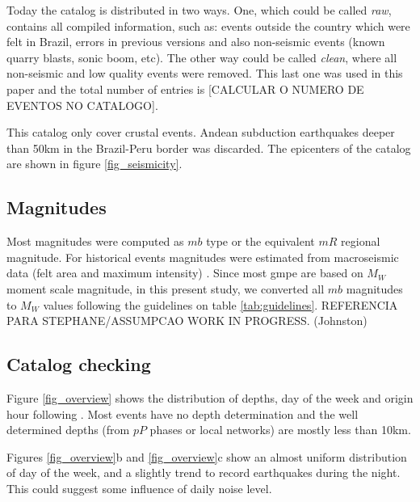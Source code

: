 \documentclass[grl]{agutex}
\begin{document}
\begin{article}
Today the catalog is distributed in two ways. One, which could be called \emph{raw}, contains all compiled information, such as: events outside the country which were felt in Brazil, errors in previous versions and also non-seismic events (known quarry blasts, sonic boom, etc). The other way could be called \emph{clean}, where all non-seismic and low quality events were removed. This last one was used in this paper and the total number of entries is [CALCULAR O NUMERO DE EVENTOS NO CATALOGO].

This catalog only cover crustal events. Andean subduction earthquakes deeper than 50km in the Brazil-Peru border was discarded. The epicenters of the catalog are shown in figure \ref{fig_seismicity}.



\subsection{Magnitudes}

Most magnitudes were computed as $mb$ type or the equivalent $mR$ \citep{assumpcao_1983} regional magnitude. For historical events magnitudes were estimated from macroseismic data (felt area and maximum intensity) \citep{berrocal_1984}. Since most \gls{gmpe} are based on $M_W$ moment scale magnitude, in this present study, we converted all $mb$ magnitudes to $M_W$ values following the guidelines on table \ref{tab:guidelines}. REFERENCIA PARA STEPHANE/ASSUMPCAO WORK IN PROGRESS. (Johnston)



\subsection{Catalog checking}

Figure \ref{fig_overview} shows the distribution of depths, day of the week and origin hour following \citet{gulia_2012}. Most events have no depth determination and the well determined depths (from $pP$ phases or local networks) are mostly less than 10km.

Figures \ref{fig_overview}b and \ref{fig_overview}c show an almost uniform distribution of day of the week, and a slightly trend to record earthquakes during the night. This could suggest some influence of daily noise level.


\end{article}
\end{document}
